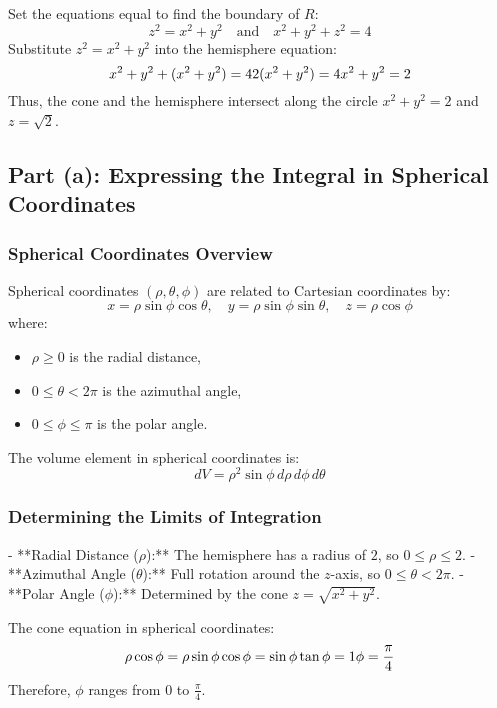 \documentclass[11pt]{article}
\begin{document}
Set the equations equal to find the boundary of \( R \):
\[
z^2 = x^2 + y^2 \quad \text{and} \quad x^2 + y^2 + z^2 = 4
\]
Substitute \( z^2 = x^2 + y^2 \) into the hemisphere equation:
\[
x^2 + y^2 + (x^2 + y^2) = 4 \\
2(x^2 + y^2) = 4 \\
x^2 + y^2 = 2
\]
Thus, the cone and the hemisphere intersect along the circle \( x^2 + y^2 = 2 \) and \( z = \sqrt{2} \).

\newpage

\subsection{Part (a): Expressing the Integral in Spherical Coordinates}

\newpage

\subsubsection{Spherical Coordinates Overview}
Spherical coordinates \((\rho, \theta, \phi)\) are related to Cartesian coordinates by:
\[
x = \rho \sin\phi \cos\theta, \quad y = \rho \sin\phi \sin\theta, \quad z = \rho \cos\phi
\]
where:
\begin{itemize}
    \item \( \rho \geq 0 \) is the radial distance,
    \item \( 0 \leq \theta < 2\pi \) is the azimuthal angle,
    \item \( 0 \leq \phi \leq \pi \) is the polar angle.
\end{itemize}
The volume element in spherical coordinates is:
\[
dV = \rho^2 \sin\phi \, d\rho \, d\phi \, d\theta
\]

\newpage

\subsubsection{Determining the Limits of Integration}

- **Radial Distance (\( \rho \)):** The hemisphere has a radius of \( 2 \), so \( 0 \leq \rho \leq 2 \).
- **Azimuthal Angle (\( \theta \)):** Full rotation around the \( z \)-axis, so \( 0 \leq \theta < 2\pi \).
- **Polar Angle (\( \phi \)):** Determined by the cone \( z = \sqrt{x^2 + y^2} \).
  
  The cone equation in spherical coordinates:
  \[
  \rho \cos\phi = \rho \sin\phi \\
  \cos\phi = \sin\phi \\
  \tan\phi = 1 \\
  \phi = \frac{\pi}{4}
  \]
  Therefore, \( \phi \) ranges from \( 0 \) to \( \frac{\pi}{4} \).
\end{document}
